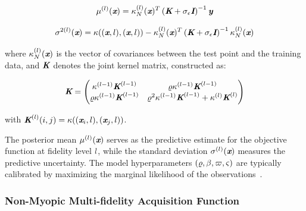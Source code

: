 \begin{equation}\label{e:MFGP2}
	\mu^{(l)} (\textbf{\em x}) = \kappa_N^{(l)}(\textbf{\em x})^T \left(\textbf{\em K} + \sigma_{\epsilon} \textbf{\em I} \right)^{-1} \textbf{\em y}
\end{equation}

\begin{equation}\label{e:MFGP3}
	\sigma^{2(l)} (\textbf{\em x}) = \kappa((\textbf{\em x}, l), (\textbf{\em x}, l)) - \kappa_N^{(l)}(\textbf{\em x})^T \left(\textbf{\em K} + \sigma_{\epsilon} \textbf{\em I} \right)^{-1} \kappa_N^{(l)}(\textbf{\em x})
\end{equation}

\noindent where $\kappa_N^{(l)}(\textbf{\em x})$ is the vector of covariances between the test point and the training data, and $\textbf{\em K}$ denotes the joint kernel matrix, constructed as:

\begin{equation} \label{e:MFGP4}
	\textbf{\em K} = \begin{pmatrix}
		\kappa^{(l-1)} \textbf{\em K}^{(l-1)}           & \varrho \kappa^{(l-1)} \textbf{\em K}^{(l-1)}                                                     \\
		\varrho \kappa^{(l-1)} \textbf{\em K}^{(l-1)} & \varrho^2 \kappa^{(l-1)} \textbf{\em K}^{(l-1)} + \kappa^{(l)} \textbf{\em K}^{(l)}
	\end{pmatrix}
\end{equation}

\noindent with $\textbf{\em K}^{(l)}(i,j) = \kappa((\textbf{\em x}_i, l), (\textbf{\em x}_j, l))$.

The posterior mean $\mu^{(l)}(\textbf{\em x})$ serves as the predictive estimate for the objective function at fidelity level $l$, while the standard deviation $\sigma^{(l)}(\textbf{\em x})$ measures the predictive uncertainty. The model hyperparameters $(\varrho, \beta, \varpi, \varsigma)$ are typically calibrated by maximizing the marginal likelihood of the observations~\cite{ForresterAl2008}.

\subsubsection{Non-Myopic Multi-fidelity Acquisition Function}
\label{s:NMAF}

